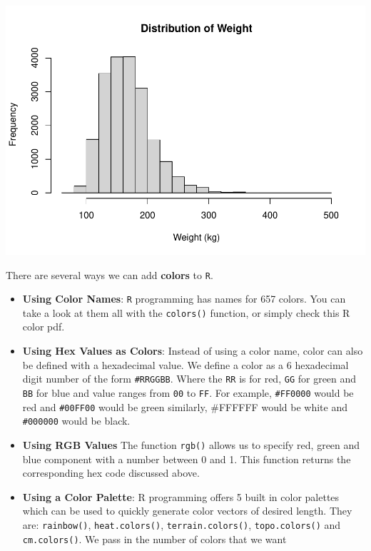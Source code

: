 \documentclass[
]{book}
\begin{document}
\includegraphics{_main_files/figure-latex/unnamed-chunk-171-1.pdf}

There are several ways we can add \textbf{colors} to \texttt{R}.

\begin{itemize}
\item
  \textbf{Using Color Names}: \texttt{R} programming has names for 657 colors. You can take a look at them all with the \texttt{colors()} function, or simply check this R color pdf.
\item
  \textbf{Using Hex Values as Colors}: Instead of using a color name, color can also be defined with a hexadecimal value. We define a color as a 6 hexadecimal digit number of the form \texttt{\#RRGGBB}. Where the \texttt{RR} is for red, \texttt{GG} for green and \texttt{BB} for blue and value ranges from \texttt{00} to \texttt{FF}. For example, \texttt{\#FF0000} would be red and \texttt{\#00FF00} would be green similarly, \#FFFFFF would be white and \texttt{\#000000} would be black.
\item
  \textbf{Using RGB Values} The function \texttt{rgb()} allows us to specify red, green and blue component with a number between 0 and 1. This function returns the corresponding hex code discussed above.
\item
  \textbf{Using a Color Palette}: R programming offers 5 built in color palettes which can be used to quickly generate color vectors of desired length. They are: \texttt{rainbow()}, \texttt{heat.colors()}, \texttt{terrain.colors()}, \texttt{topo.colors()} and \texttt{cm.colors()}. We pass in the number of colors that we want
\end{itemize}
\end{document}
